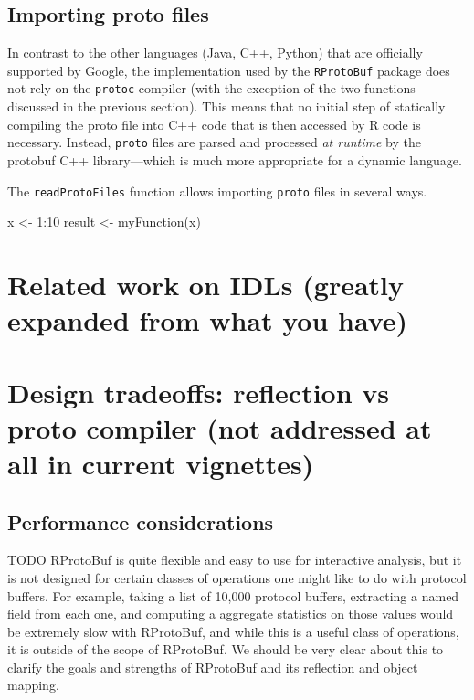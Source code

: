 \subsection{Importing proto files}

In contrast to the other languages (Java, C++, Python) that are officially
supported by Google, the implementation used by the \texttt{RProtoBuf}
package does not rely on the \texttt{protoc} compiler (with the exception of
the two functions discussed in the previous section). This means that no
initial step of statically compiling the proto file into C++ code that is
then accessed by R code is necessary. Instead, \texttt{proto} files are
parsed and processed \textsl{at runtime} by the protobuf C++ library---which
is much more appropriate for a dynamic language.

The \texttt{readProtoFiles} function allows importing \texttt{proto}
files in several ways.

\begin{example}
  x <- 1:10
  result <- myFunction(x)
\end{example}

\section{Related work on IDLs (greatly expanded from what you have)}

\section{Design tradeoffs: reflection vs proto compiler (not addressed
  at all in current vignettes)}

\subsection{Performance considerations}

TODO RProtoBuf is quite flexible and easy to use for interactive
analysis, but it is not designed for certain classes of operations one
might like to do with protocol buffers.  For example, taking a list of
10,000 protocol buffers, extracting a named field from each one, and
computing a aggregate statistics on those values would be extremely
slow with RProtoBuf, and while this is a useful class of operations,
it is outside of the scope of RProtoBuf.  We should be very clear
about this to clarify the goals and strengths of RProtoBuf and its
reflection and object mapping.

